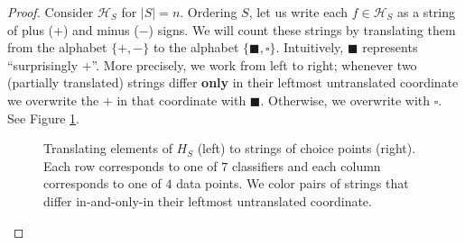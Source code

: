 \documentclass[twocolumn, 11pt]{article}
\newcommand{\Hh}{\mathcal{H}}
\theoremstyle{definition}
\begin{document}
        \begin{proof}
            Consider $\Hh_S$ for $|S|=n$.  Ordering $S$, let us write each
            $f\in \Hh_S$ as a string of plus ($+$) and minus ($-$) signs.  We
            will count these strings by translating them from the alphabet
            $\{+,-\}$ to the alphabet $\{\blacksquare,\square\}$.
            Intuitively, $\blacksquare$ represents ``surprisingly $+$''.  More
            precisely, we work from left to right; whenever two (partially
            translated) strings differ \textbf{only} in their leftmost
            untranslated coordinate we overwrite the $+$ in that coordinate
            with $\blacksquare$.  Otherwise, we overwrite with $\square$.
            See Figure \ref{fig:sauer}.

            \begin{figure}[H]
                \centering
                \caption{
                    Translating elements of $H_S$ (left) to strings of choice
                    points (right).  Each row corresponds to one of $7$ classifiers
                    and each column corresponds to one of $4$ data points.
                    We color pairs of strings that differ in-and-only-in their
                    leftmost untranslated coordinate.
                }
                \label{fig:sauer}
            \end{figure}


\end{proof}
\end{document}
